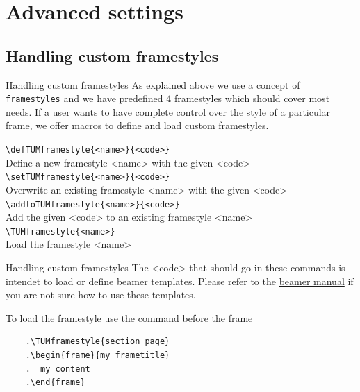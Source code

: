 \section{Advanced settings}
\subsection{Handling custom framestyles}
\begin{frame}[fragile]{Handling custom framestyles}
  As explained above we use a concept of \texttt{framestyles} and we have
  predefined 4 framestyles which should cover most needs.
  If a user wants to have complete control over the style of a particular
  frame, we offer macros to define and load custom framestyles.

  \vspace{3mm}
  \lstinline|\defTUMframestyle{<name>}{<code>}| \\
  \hspace{5mm} Define a new framestyle <name> with the given <code>\\
  \lstinline|\setTUMframestyle{<name>}{<code>}| \\
  \hspace{5mm} Overwrite an existing framestyle <name> with the given <code>\\
  \lstinline|\addtoTUMframestyle{<name>}{<code>}| \\
  \hspace{5mm} Add the given <code> to an existing framestyle <name>\\
  \lstinline|\TUMframestyle{<name>}| \\
  \hspace{5mm} Load the framestyle <name> \\
\end{frame}

\begin{frame}[fragile]{Handling custom framestyles}
  The <code> that should go in these commands is intendet to load or define
  beamer templates. Please refer to the
  \href{https://ctan.org/pkg/beamer}{beamer manual} if you are not sure how
  to use these templates.

  To load the framestyle use the command before the frame
  \begin{lstlisting}
    .\TUMframestyle{section page}
    .\begin{frame}{my frametitle}
    .  my content
    .\end{frame}
  \end{lstlisting}
\end{frame}

